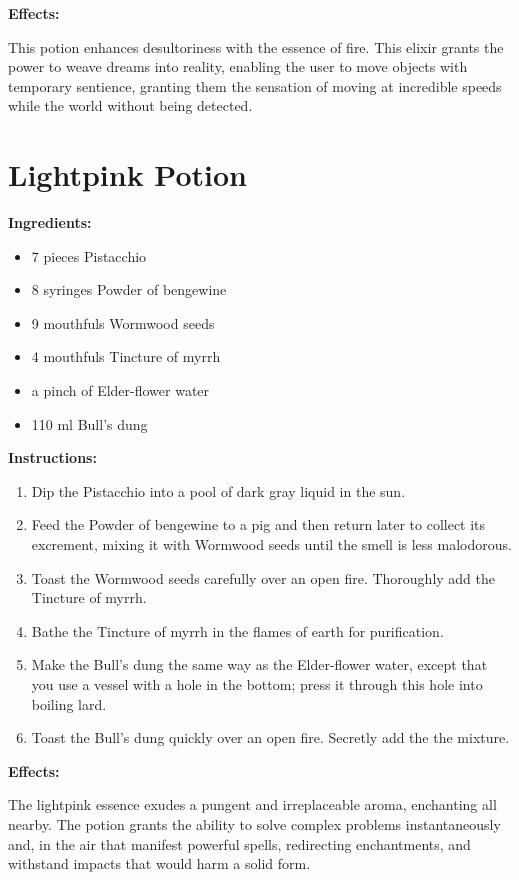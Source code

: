 \documentclass{article}
\begin{document}
\textbf{Effects:}

This potion enhances desultoriness with the essence of fire. This elixir grants the power to weave dreams into reality, enabling the user to move objects with temporary sentience, granting them the sensation of moving at incredible speeds while the world without being detected.

\newpage
\section*{Lightpink Potion}

\textbf{Ingredients:}

\begin{itemize}
  \item 7 pieces Pistacchio
  \item 8 syringes Powder of bengewine
  \item 9 mouthfuls Wormwood seeds
  \item 4 mouthfuls Tincture of myrrh
  \item a pinch of Elder-flower water
  \item 110 ml Bull's dung
\end{itemize}

\textbf{Instructions:}

\begin{enumerate}
  \item Dip the Pistacchio into a pool of dark gray liquid in the sun.
  \item Feed the Powder of bengewine to a pig and then return later to collect its excrement, mixing it with Wormwood seeds until the smell is less malodorous.
  \item Toast the Wormwood seeds carefully over an open fire. Thoroughly add the Tincture of myrrh.
  \item Bathe the Tincture of myrrh in the flames of earth for purification.
  \item Make the Bull's dung the same way as the Elder-flower water, except that you use a vessel with a hole in the bottom; press it through this hole into boiling lard.
  \item Toast the Bull's dung quickly over an open fire. Secretly add the the mixture.
\end{enumerate}

\textbf{Effects:}

The lightpink essence exudes a pungent and irreplaceable aroma, enchanting all nearby. The potion grants the ability to solve complex problems instantaneously and, in the air that manifest powerful spells, redirecting enchantments, and withstand impacts that would harm a solid form.
\end{document}
